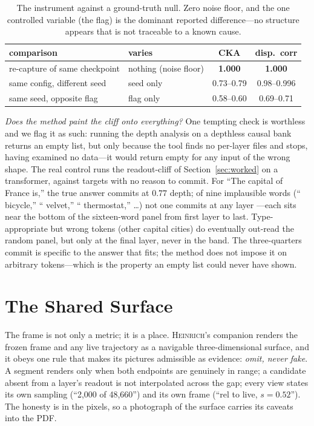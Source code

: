 \documentclass[11pt,a4paper]{article}
\newcommand{\heinrich}{\textsc{Heinrich}}
\begin{document}
\begin{table}[H]
\centering
\small
\begin{tabular}{llcc}
\toprule
comparison & varies & CKA & disp.\ corr \\
\midrule
re-capture of same checkpoint & nothing (noise floor) & \textbf{1.000} & \textbf{1.000} \\
same config, different seed    & seed only  & 0.73--0.79 & 0.98--0.996 \\
same seed, opposite flag       & flag only  & 0.58--0.60 & 0.69--0.71 \\
\bottomrule
\end{tabular}
\caption{The instrument against a ground-truth null. Zero noise floor, and the one
controlled variable (the flag) is the dominant reported difference---no structure
appears that is not traceable to a known cause.}
\label{tab:validation}
\end{table}

\emph{Does the method paint the cliff onto everything?} One tempting check is
worthless and we flag it as such: running the depth analysis on a depthless causal
bank returns an empty list, but only because the tool finds no per-layer files and
stops, having examined no data---it would return empty for any input of the wrong
shape. The real control runs the readout-cliff of Section~\ref{sec:worked} on a
transformer, against targets with no reason to commit. For ``The capital of France
is,'' the true answer commits at $0.77$ depth; of nine implausible words
(`` bicycle,'' `` velvet,'' `` thermostat,'' \ldots) not one commits at any layer
---each sits near the bottom of the sixteen-word panel from first layer to last.
Type-appropriate but wrong tokens (other capital cities) do eventually out-read the
random panel, but only at the final layer, never in the band. The three-quarters
commit is specific to the answer that fits; the method does not impose it on
arbitrary tokens---which is the property an empty list could never have shown.

\section{The Shared Surface}

The frame is not only a metric; it is a place. \heinrich{}'s companion renders the
frozen frame and any live trajectory as a navigable three-dimensional surface, and it
obeys one rule that makes its pictures admissible as evidence: \emph{omit, never fake}.
A segment renders only when both endpoints are genuinely in range; a candidate absent
from a layer's readout is not interpolated across the gap; every view states its own
sampling (``2{,}000 of 48{,}660'') and its own frame (``rel to live, $s{=}0.52$''). The
honesty is in the pixels, so a photograph of the surface carries its caveats into the
PDF.
\end{document}
